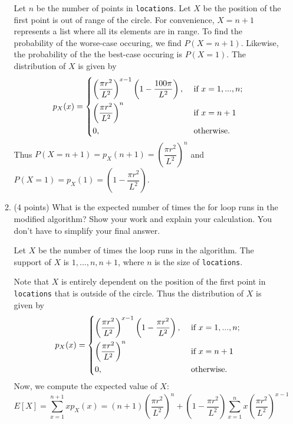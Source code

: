 \documentclass{assignment-263}
\begin{document}
\begin{enumerate}
\begin{enumerate}
    Let \(n\) be the number of points in \verb|locations|. Let \(X\) be the position of the first point is out of range of the circle. For convenience, \(X = n + 1\) represents a list where all its elements are in range. To find the probability of the worse-case occuring, we find \(P(X = n + 1)\). Likewise, the probability of the the best-case occuring is \(P(X = 1)\). The distribution of \(X\) is given by
    \[
      p_X(x) = \begin{dcases}
        \left( \dfrac{\pi r^2}{L^2} \right)^{x-1} \left( 1 - \dfrac{100\pi}{L^2} \right), &\text{ if } x = 1, ..., n ;\\
        \left( \dfrac{\pi r^2}{L^2} \right)^{n} &\text{ if } x = n + 1 \\
        0, &\text{ otherwise} .
      \end{dcases}
    \]
    Thus \(P(X = n + 1) = p_X(n + 1) = \left( \dfrac{\pi r^2}{L^2} \right)^{n}\) and \(P(X = 1) = p_X(1) = \left( 1 - \dfrac{\pi r^2}{L^2} \right)\).


    \item (4 points) What is the expected number of times the for loop runs in the modified algorithm? Show your work and explain your calculation. You don't have to simplify your final answer.
    
    Let \(X\) be the number of times the loop runs in the algorithm. The support of \(X\) is \(1, ..., n, n + 1\), where \(n\) is the size of \verb|locations|.

    Note that \(X\) is entirely dependent on the position of the first point in \verb|locations| that is outside of the circle. Thus the distribution of \(X\) is given by
    \[
      p_X(x) = \begin{dcases}
        \left( \dfrac{\pi r^2}{L^2} \right)^{x-1} \left( 1 - \dfrac{\pi r^2}{L^2} \right), &\text{ if } x = 1, ..., n ;\\
        \left( \dfrac{\pi r^2}{L^2} \right)^{n} &\text{ if } x = n + 1 \\
        0, &\text{ otherwise} .
      \end{dcases}
    \]
    Now, we compute the expected value of \(X\):
    \[
      E[X] = \sum_{x=1}^{n+1} x p_X(x) = (n + 1)\left( \dfrac{\pi r^2}{L^2} \right)^{n} + \left( 1 - \dfrac{\pi r^2}{L^2} \right)\sum_{x=1}^{n} x\left( \dfrac{\pi r^2}{L^2} \right)^{x - 1}
    \]
\end{enumerate}

\end{enumerate}
\end{document}
